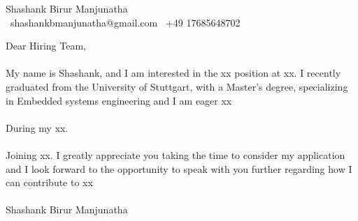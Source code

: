 \documentclass{bmsnkresume}
\makeatletter
\newcommand{\letterhead}{%
  \begin{flushleft}
    {\fontsize{17}{20}\selectfont\cvemphsize\color{primary}Shashank Birur Manjunatha}\\[0.35em]
    {\fontsize{11}{13.2}\selectfont\color{darktext}{\faEnvelopeO}~shashankbmanjunatha@gmail.com \quad {\faMobile}~+49 17685648702}
  \end{flushleft}
  \vspace{-0.6em}%
  \noindent{\color{lighttext}\rule{\linewidth}{0.3pt}}%
  \par\vspace{1.2em}\noindent%
}
\makeatother
\begin{document}
\letterhead
Dear Hiring Team,\\
\\
My name is Shashank, and I am interested in the xx position at xx. I recently graduated from the University of Stuttgart, with a Master's degree, specializing in Embedded systems engineering and I am eager xx \\
\\
During my xx.\\
\\
Joining xx. I greatly appreciate you taking the time to consider my application and I look forward to the opportunity to speak with you further regarding how I can contribute to xx\\
\\
Shashank Birur Manjunatha
\end{document}
